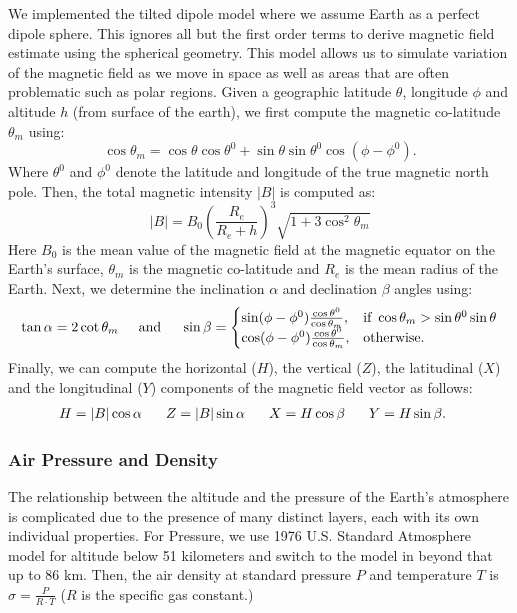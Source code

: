 \documentclass[graybox]{svmult}
\begin{document}
We implemented the tilted dipole model where we assume Earth as a perfect dipole sphere. This ignores all but the first order terms to derive magnetic field estimate using the spherical geometry. This model allows us to simulate variation of the magnetic field as we move in space as well as areas that are often problematic such as polar regions. Given a geographic latitude $\theta$, longitude $\phi$ and altitude $h$ (from surface of the earth), we first compute the magnetic co-latitude $\theta_m$ using:
\begin{equation*}
\cos\theta_m = \cos\theta\cos\theta^0 + \sin\theta\sin\theta^0\cos(\phi-\phi^0).
\end{equation*}
Where $\theta^0$ and $\phi^0$ denote the latitude and longitude of the true magnetic north pole. Then, the total magnetic intensity $|B|$ is computed as:
\begin{equation*}
|B| = B_0 (\frac{R_e}{R_e + h})^3\sqrt{1 + 3\cos^2\theta_m}
\end{equation*}
Here $B_0$ is the mean value of the magnetic field at the magnetic equator on the Earth's surface, $\theta_m$ is the magnetic co-latitude and $R_e$ is the mean radius of the Earth. Next, we determine the inclination $\alpha$ and declination $\beta$ angles using: 
\begin{equation*}
\tan{\alpha} = 2\cot\theta_m \hspace{0.2in} \mbox{and} \hspace{0.2in} \sin\beta = 
\begin{cases}
\sin(\phi-\phi^0)\frac{\cos\theta^0}{\cos\theta_m}, & \mbox{if } \cos\theta_m > \sin\theta^0\sin\theta\\ 
\cos(\phi-\phi^0)\frac{\cos\theta^0}{\cos\theta_m}, & \mbox{otherwise}.
\end{cases}
\end{equation*}
Finally, we can compute the horizontal ($H$), the vertical ($Z$), the latitudinal ($X$) and the longitudinal ($Y$) components of the magnetic field vector as follows:
\begin{align*}
H &= |B|\cos\alpha &\hspace{0.1in} Z &= |B|\sin\alpha &\hspace{0.1in} X &= H\cos\beta &\hspace{0.1in} Y &= H\sin\beta.
\end{align*}

\subsubsection{Air Pressure and Density}
\label{sec:PressureAndAir}
The relationship between the altitude and the pressure of the Earth's atmosphere is complicated due to the presence of many distinct layers, each with its own individual properties. For Pressure, we use 1976 U.S. Standard Atmosphere model \cite{stull} for altitude below 51 kilometers and switch to the model in \cite{Braeunig} beyond that up to 86 km. Then, the air density at standard pressure $P$ and temperature $T$ is $\sigma = \frac{P}{R \cdot T}$ ($R$ is the specific gas constant.) 
\end{document}
